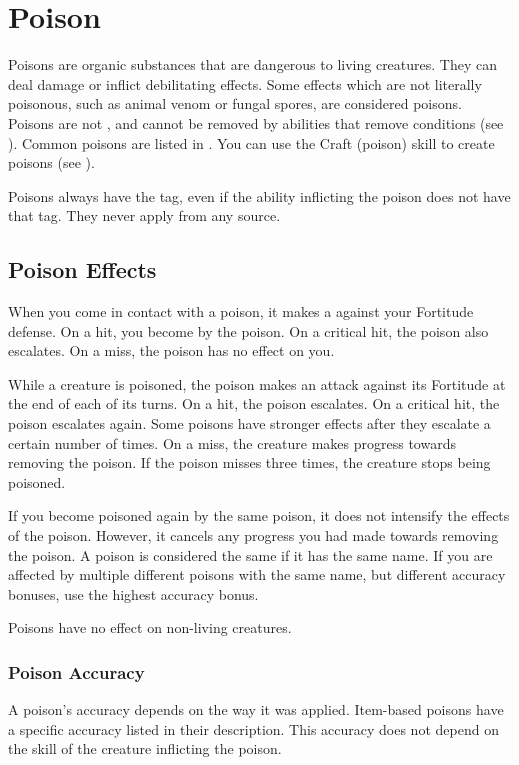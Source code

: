 \section{Poison}\label{Poison}
  Poisons are organic substances that are dangerous to living creatures.
  They can deal damage or inflict debilitating effects.
  Some effects which are not literally poisonous, such as animal venom or fungal spores, are considered poisons.
  Poisons are not , and cannot be removed by abilities that remove conditions (see ).
  Common poisons are listed in .
  You can use the Craft (poison) skill to create poisons (see ).

  Poisons always have the \atPoison tag, even if the ability inflicting the poison does not have that tag.
  They never apply  from any source.

  \subsection{Poison Effects}\label{Poison Effects}
    When you come in contact with a poison, it makes a  against your Fortitude defense.
    On a hit, you become  by the poison.
    On a critical hit, the poison also escalates.
    On a miss, the poison has no effect on you.

    While a creature is poisoned, the poison makes an attack against its Fortitude at the end of each of its turns.
    On a hit, the poison escalates.
    On a critical hit, the poison escalates again.
    Some poisons have stronger effects after they escalate a certain number of times.
    On a miss, the creature makes progress towards removing the poison.
    If the poison misses three times, the creature stops being poisoned.

    If you become poisoned again by the same poison, it does not intensify the effects of the poison.
    However, it cancels any progress you had made towards removing the poison.
    A poison is considered the same if it has the same name.
    If you are affected by multiple different poisons with the same name, but different accuracy bonuses, use the highest accuracy bonus.

    Poisons have no effect on non-living creatures.

    \subsubsection{Poison Accuracy}
      A poison's accuracy depends on the way it was applied.
      Item-based poisons have a specific accuracy listed in their description.
      This accuracy does not depend on the skill of the creature inflicting the poison.

